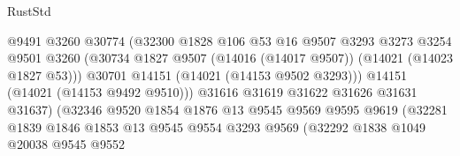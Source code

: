 \begin{lexlean}{RustStd}
\begin{coremodule}
                                        @9491
                                        @3260
                                        @30774
                                        (@32300
                                          @1828
                                          @106
                                          @53
                                          @16
                                          @9507
                                          @3293
                                          @3273
                                          @3254
                                          @9501
                                          @3260
                                          (@30734
                                            @1827
                                            @9507
                                            (@14016 (@14017 @9507))
                                            (@14021 (@14023 @1827 @53)))
                                          @30701
                                          @14151
                                          (@14021 (@14153 @9502 @3293)))
                                        @14151
                                        (@14021 (@14153 @9492 @9510)))
                                      @31616
                                      @31619
                                      @31622
                                      @31626
                                      @31631
                                      @31637)
                                    (@32346
                                      @9520
                                      @1854
                                      @1876
                                      @13
                                      @9545
                                      @9569
                                      @9595
                                      @9619
                                      (@32281
                                        @1839
                                        @1846
                                        @1853
                                        @13
                                        @9545
                                        @9554
                                        @3293
                                        @9569
                                        (@32292
                                          @1838
                                          @1049
                                          @20038
                                          @9545
                                          @9552

\end{coremodule}
\end{lexlean}
